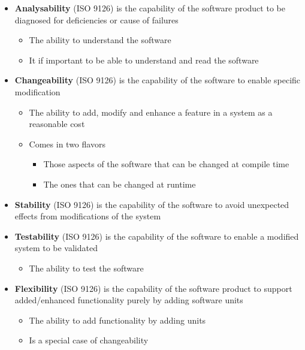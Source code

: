 \documentclass[11pt]{article}
\providecommand{\tightlist}{%
      \setlength{\itemsep}{0pt}\setlength{\parskip}{0pt}}
\begin{document}
\begin{itemize}
\item
  \textbf{Analysability} (ISO 9126) is the capability of the software
  product to be diagnosed for deficiencies or cause of failures

  \begin{itemize}
  \tightlist
  \item
    The ability to understand the software
  \item
    It if important to be able to understand and read the software
  \end{itemize}
\item
  \textbf{Changeability} (ISO 9126) is the capability of the software to
  enable specific modification

  \begin{itemize}
  \tightlist
  \item
    The ability to add, modify and enhance a feature in a system as a
    reasonable cost
  \item
    Comes in two flavors

    \begin{itemize}
    \tightlist
    \item
      Those aspects of the software that can be changed at compile time
    \item
      The ones that can be changed at runtime
    \end{itemize}
  \end{itemize}
\item
  \textbf{Stability} (ISO 9126) is the capability of the software to
  avoid unexpected effects from modifications of the system
\item
  \textbf{Testability} (ISO 9126) is the capability of the software to
  enable a modified system to be validated

  \begin{itemize}
  \tightlist
  \item
    The ability to test the software
  \end{itemize}
\item
  \textbf{Flexibility} (ISO 9126) is the capability of the software
  product to support added/enhanced functionality purely by adding
  software units

  \begin{itemize}
  \tightlist
  \item
    The ability to add functionality by adding units
  \item
    Is a special case of changeability
  \end{itemize}
\end{itemize}
\end{document}
